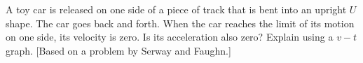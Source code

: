  A toy car is released on one side of a piece of track
that is bent into an upright $U$ shape. The car goes back
and forth. When the car reaches the limit of its motion on
one side, its velocity is zero. Is its acceleration also
zero? Explain using a $v-t$ graph. [Based on a problem
by Serway and Faughn.]
